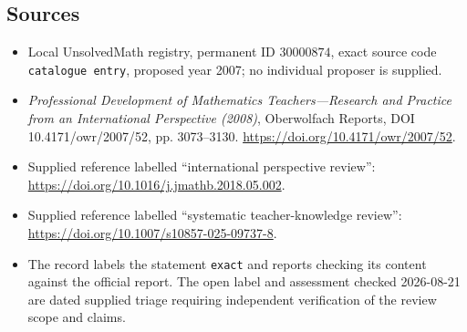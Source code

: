 \documentclass[11pt]{article}
\begin{document}
\subsection{Sources}
\begin{itemize}
\item Local UnsolvedMath registry, permanent ID \(30000874\), exact source code \texttt{catalogue entry}, proposed year 2007; no individual proposer is supplied.
\item \emph{Professional Development of Mathematics Teachers---Research and Practice from an International Perspective (2008)}, Oberwolfach Reports, DOI 10.4171/owr/2007/52, pp. 3073--3130. \url{https://doi.org/10.4171/owr/2007/52}.
\item Supplied reference labelled ``international perspective review'': \url{https://doi.org/10.1016/j.jmathb.2018.05.002}.
\item Supplied reference labelled ``systematic teacher-knowledge review'': \url{https://doi.org/10.1007/s10857-025-09737-8}.
\item The record labels the statement \texttt{exact} and reports checking its content against the official report. The open label and assessment checked 2026-08-21 are dated supplied triage requiring independent verification of the review scope and claims.
\end{itemize}
\end{document}
